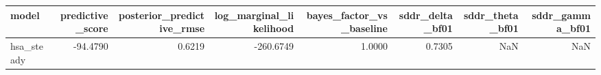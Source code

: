 \begin{tabular}{lrrrrrrr}
\toprule
model & predictive\_score & posterior\_predictive\_rmse & log\_marginal\_likelihood & bayes\_factor\_vs\_baseline & sddr\_delta\_bf01 & sddr\_theta\_bf01 & sddr\_gamma\_bf01 \\
\midrule
hsa\_steady & -94.4790 & 0.6219 & -260.6749 & 1.0000 & 0.7305 & NaN & NaN \\
\bottomrule
\end{tabular}
